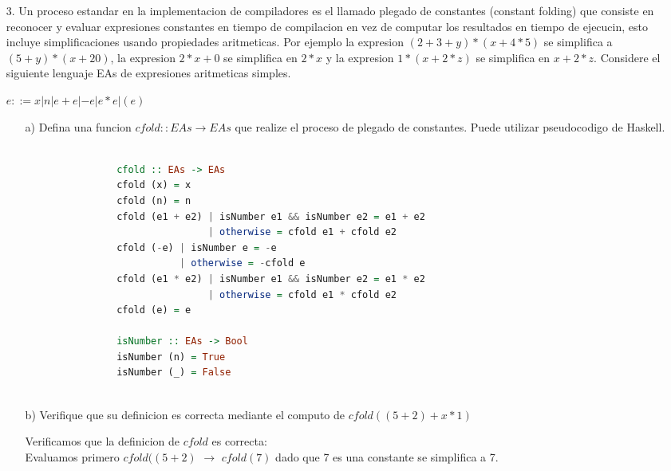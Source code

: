 \documentclass{article}
\begin{document}
\begin{itemize}
        \item[3.] Un proceso estandar en la implementacion de compiladores es el llamado plegado de constantes (constant folding) que consiste en reconocer y evaluar expresiones constantes en tiempo de compilacion en vez de computar los resultados en tiempo de ejecucin, esto incluye simplificaciones usando propiedades aritmeticas. Por ejemplo la expresion $(2+3+y)*(x+4*5)$ se simplifica a $(5 + y)*(x + 20)$, la expresion $2 * x + 0$ se simplifica en $2 * x$ y la expresion $1 * (x + 2 * z)$ se simplifica en $x + 2 * z$. Considere el siguiente lenguaje EAs de expresiones aritmeticas simples.
            \begin{center}
                $e ::= x | n | e + e | -e | e * e | (e)$
            \end{center}
    
            \begin{itemize}
                \item[a)] Defina una funcion $cfold :: EAs \rightarrow EAs$ que realize el proceso de plegado de constantes. Puede utilizar pseudocodigo de Haskell.

                \begin{lstlisting}[language=Haskell]

                cfold :: EAs -> EAs
                cfold (x) = x
                cfold (n) = n
                cfold (e1 + e2) | isNumber e1 && isNumber e2 = e1 + e2
                                | otherwise = cfold e1 + cfold e2
                cfold (-e) | isNumber e = -e
                           | otherwise = -cfold e
                cfold (e1 * e2) | isNumber e1 && isNumber e2 = e1 * e2
                                | otherwise = cfold e1 * cfold e2
                cfold (e) = e

                isNumber :: EAs -> Bool
                isNumber (n) = True
                isNumber (_) = False
                
                \end{lstlisting}

                \item[b)] Verifique que su definicion es correcta mediante el computo de $cfold((5 + 2) + x * 1)$

                Verificamos que la definicion de $cfold$ es correcta:\\
                Evaluamos primero $cfold((5 + 2)$ $\rightarrow$ $cfold(7)$ dado que 7 es una constante se simplifica a 7.\\


\end{itemize}
\end{itemize}
\end{document}
